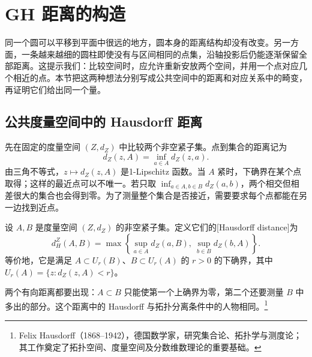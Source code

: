 
% 
% 

\section{GH 距离的构造}
\label{g3:sec:1002}

同一个圆可以平移到平面中很远的地方，圆本身的距离结构却没有改变。另一方面，一条越来越细的圆柱即使没有与区间相同的点集，沿轴投影后仍能逐渐保留全部距离。这提示我们：比较空间时，应允许重新安放两个空间，并用一个点对应几个相近的点。本节把这两种想法分别写成公共空间中的距离和对应关系中的畸变，再证明它们给出同一个量。

\subsection{公共度量空间中的 Hausdorff 距离}
\label{g3:subsec:1002:01}

先在固定的度量空间 \((Z,d_Z)\) 中比较两个非空紧子集。点到集合的距离记为
\[
	d_Z(z,A)=\inf_{a\in A}d_Z(z,a).
\]
由三角不等式，\(z\mapsto d_Z(z,A)\) 是1-Lipschitz 函数。当 \(A\) 紧时，下确界在某个点取得；这样的最近点可以不唯一。若只取 \(\inf_{a\in A,b\in B}d_Z(a,b)\)，两个相交但相差很大的集合也会得到零。为了测量整个集合是否接近，需要要求每个点都能在另一边找到近点。

\begin{definition}\label{g3:def:hausdorff-distance}
	设 \(A,B\) 是度量空间 \((Z,d_Z)\) 的非空紧子集。定义它们的[Hausdorff distance]为
	\begin{equation}\label{g3:eq:hausdorff-distance}
		d_H^Z(A,B)=\max\left\{\sup_{a\in A}d_Z(a,B),\ \sup_{b\in B}d_Z(b,A)\right\}.
	\end{equation}
	等价地，它是满足 \(A\subset U_r(B)\)、\(B\subset U_r(A)\) 的 \(r>0\) 的下确界，其中 \(U_r(A)=\{z:d_Z(z,A)<r\}\)。
\end{definition}

两个有向距离都要出现：\(A\subset B\) 只能使第一个上确界为零，第二个还要测量 \(B\) 中多出的部分。这个距离中的 Hausdorff 与拓扑分离条件中的人物相同。\footnote{Felix Hausdorff（1868--1942），德国数学家，研究集合论、拓扑学与测度论；其工作奠定了拓扑空间、度量空间及分数维数理论的重要基础。}


